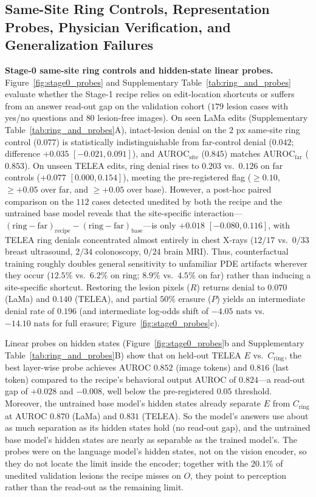 \documentclass[journal]{IEEEtran}
\begin{document}
\subsection{Same-Site Ring Controls, Representation Probes, Physician Verification, and Generalization Failures}
\label{subsec:exp_probes_readers_failures}
\textbf{Stage-0 same-site ring controls and hidden-state linear probes.} Figure~\ref{fig:stage0_probes} and Supplementary Table~\ref{tab:ring_and_probes} evaluate whether the Stage-1 recipe relies on edit-location shortcuts or suffers from an answer read-out gap on the validation cohort ($179$ lesion cases with yes/no questions and $80$ lesion-free images). On seen LaMa edits (Supplementary Table~\ref{tab:ring_and_probes}A), intact-lesion denial on the $2\text{ px}$ same-site ring control ($0.077$) is statistically indistinguishable from far-control denial ($0.042$; difference $+0.035$ $[-0.021, 0.091]$), and $\text{AUROC}_{\text{site}}$ ($0.845$) matches $\text{AUROC}_{\text{far}}$ ($0.853$). On unseen TELEA edits, ring denial rises to $0.203$ vs.\ $0.126$ on far controls ($+0.077$ $[0.000, 0.154]$), meeting the pre-registered flag ($\ge 0.10$, $\ge +0.05$ over far, and $\ge +0.05$ over base). However, a post-hoc paired comparison on the $112$ cases detected unedited by both the recipe and the untrained base model reveals that the site-specific interaction---$(\text{ring} - \text{far})_{\text{recipe}} - (\text{ring} - \text{far})_{\text{base}}$---is only $+0.018$ $[-0.080, 0.116]$, with TELEA ring denials concentrated almost entirely in chest X-rays ($12/17$ vs.\ $0/33$ breast ultrasound, $2/34$ colonoscopy, $0/24$ brain MRI). Thus, counterfactual training roughly doubles general sensitivity to unfamiliar PDE artifacts wherever they occur ($12.5\%$ vs.\ $6.2\%$ on ring; $8.9\%$ vs.\ $4.5\%$ on far) rather than inducing a site-specific shortcut. Restoring the lesion pixels ($R$) returns denial to $0.070$ (LaMa) and $0.140$ (TELEA), and partial $50\%$ erasure ($P$) yields an intermediate denial rate of $0.196$ (and intermediate log-odds shift of $-4.05\text{ nats}$ vs.\ $-14.10\text{ nats}$ for full erasure; Figure~\ref{fig:stage0_probes}c).

Linear probes on hidden states (Figure~\ref{fig:stage0_probes}b and Supplementary Table~\ref{tab:ring_and_probes}B) show that on held-out TELEA $E$ vs.\ $C_{\text{ring}}$, the best layer-wise probe achieves $\text{AUROC } 0.852$ (image tokens) and $0.816$ (last token) compared to the recipe's behavioral output AUROC of $0.824$---a read-out gap of $+0.028$ and $-0.008$, well below the pre-registered $0.05$ threshold. Moreover, the untrained base model's hidden states already separate $E$ from $C_{\text{ring}}$ at $\text{AUROC } 0.870$ (LaMa) and $0.831$ (TELEA). So the model's answers use about as much separation as its hidden states hold (no read-out gap), and the untrained base model's hidden states are nearly as separable as the trained model's. The probes were on the language model's hidden states, not on the vision encoder, so they do not locate the limit inside the encoder; together with the $20.1\%$ of unedited validation lesions the recipe misses on $O$, they point to perception rather than the read-out as the remaining limit.
\end{document}
